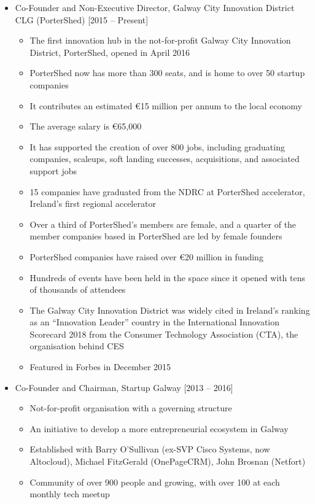 \documentclass[10pt,a4paper]{res} %
\begin{document}
\begin{resume}
\begin{itemize} \itemsep -2pt
\item Co-Founder and Non-Executive Director, Galway City Innovation District CLG (PorterShed) [2015 -- Present]
\begin{itemize} \itemsep -2pt
\item The first innovation hub in the not-for-profit Galway City Innovation District, PorterShed, opened in April 2016
\item PorterShed now has more than 300 seats, and is home to over 50 startup companies
\item It contributes an estimated \euro{}15 million per annum to the local economy
\item The average salary is \euro{}65,000
\item It has supported the creation of over 800 jobs, including graduating companies, scaleups, soft landing successes, acquisitions, and associated support jobs
\item 15 companies have graduated from the NDRC at PorterShed accelerator, Ireland's first regional accelerator
\item Over a third of PorterShed's members are female, and a quarter of the member companies based in PorterShed are led by female founders
\item PorterShed companies have raised over \euro{}20 million in funding
\item Hundreds of events have been held in the space since it opened with tens of thousands of attendees
\item The Galway City Innovation District was widely cited in Ireland's ranking as an ``Innovation Leader'' country in the International Innovation Scorecard 2018 from the Consumer Technology Association (CTA), the organisation behind CES
\item Featured in Forbes in December 2015
\end{itemize}
\item Co-Founder and Chairman, Startup Galway [2013 -- 2016]
\begin{itemize} \itemsep -2pt
\item Not-for-profit organisation with a governing structure
\item An initiative to develop a more entrepreneurial ecosystem in Galway
\item Established with Barry O'Sullivan (ex-SVP Cisco Systems, now Altocloud), Michael FitzGerald (OnePageCRM), John Brosnan (Netfort)
\item Community of over 900 people and growing, with over 100 at each monthly tech meetup

\end{itemize}
\end{itemize}
\end{resume}
\end{document}
